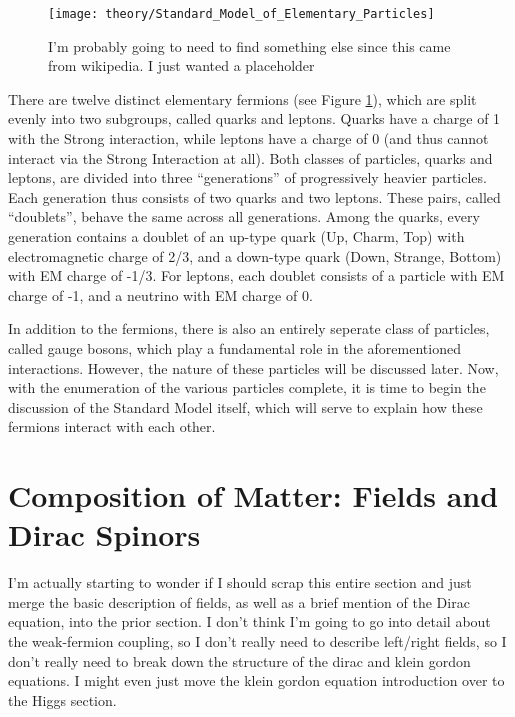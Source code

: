     \begin{figure}[h!]
        \texttt{[image: theory/Standard\_Model\_of\_Elementary\_Particles]}
        \caption{I'm probably going to need to find something else since this came from wikipedia. I just wanted a placeholder}
        \label{fig:sm_particles}
    \end{figure}
        

    There are twelve distinct elementary fermions (see Figure \ref{fig:sm_particles}),
        which are split evenly into two subgroups, called quarks and leptons.
    Quarks have a charge of 1 with the Strong interaction,
        while leptons have a charge of 0 (and thus cannot interact via the Strong Interaction at all).
    Both classes of particles, quarks and leptons, are divided into three ``generations'' of progressively heavier particles.
    Each generation thus consists of two quarks and two leptons.
    These pairs, called ``doublets'', behave the same across all generations.
    Among the quarks, every generation contains a doublet of an up-type quark (Up, Charm, Top) with electromagnetic charge of 2/3,
        and a down-type quark (Down, Strange, Bottom) with EM charge of -1/3.
    For leptons, each doublet consists of a particle with EM charge of -1, and a neutrino with EM charge of 0.

    In addition to the fermions, there is also an entirely seperate class of particles, called gauge bosons,
        which play a fundamental role in the aforementioned interactions.
    However, the nature of these particles will be discussed later.
    Now, with the enumeration of the various particles complete, it is time to begin the discussion of the Standard Model itself,
        which will serve to explain how these fermions interact with each other.



\section{Composition of Matter: Fields and Dirac Spinors}
    I'm actually starting to wonder if I should scrap this entire section and just merge the basic description of fields,
        as well as a brief mention of the Dirac equation, into the prior section.
    I don't think I'm going to go into detail about the weak-fermion coupling,
        so I don't really need to describe left/right fields, so I don't really need to break down the structure of
        the dirac and klein gordon equations.
    I might even just move the klein gordon equation introduction over to the Higgs section.

